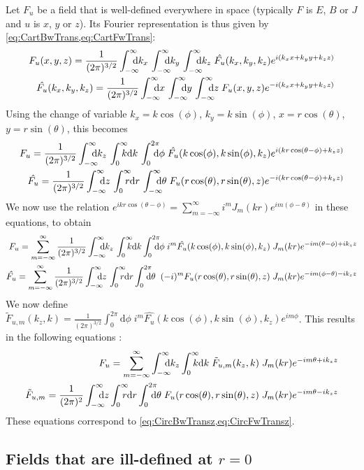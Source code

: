 Let $F_u$ be a field that is well-defined everywhere in space
(typically $F$ is $E$, $B$ or $J$ and $u$ is $x$, $y$ or $z$). Its Fourier representation
is thus given by \cref{eq:CartBwTrans,eq:CartFwTrans}:
\begin{align*}
F_u(x,y,z) = \frac{1}{(2\pi)^{3/2}}\Integ{k_x} \,\Integ{k_y}\,
\Integ{k_z} \; \hat{F_u}(k_x,k_y,k_z) e^{i(k_x x + k_y y + k_z z)} \\
\hat{F_u}(k_x,k_y,k_z)  = \frac{1}{(2\pi)^{3/2}}\Integ{x} \,\Integ{y}\,
\Integ{z} \; F_u(x,y,z) e^{-i(k_x x + k_y y + k_z z)} 
\end{align*}
Using the change of variable $k_x=k\cos(\phi)$, $k_y = k\sin(\phi)$,
$x=r\cos(\theta)$, $y=r\sin(\theta)$, this becomes
 \begin{align*}
F_u = \frac{1}{(2\pi)^{3/2}}\Integ{k_z} \,\RInteg{k}\,
\TInteg{\phi} \; \hat{F_u}(k\cos(\phi),k\sin(\phi),k_z)
e^{i(k r \cos(\theta-\phi) + k_z z)} \\
\hat{F_u}  = \frac{1}{(2\pi)^{3/2}}\Integ{z} \,\RInteg{r}\,
\Integ{\theta} \; F_u(r\cos(\theta),r\sin(\theta),z) e^{-i(k r \cos(\theta-\phi) + k_z z)} 
\end{align*}
We now use the relation $e^{ikr\cos(\theta-\phi)} =
\sum_{m=-\infty}^{\infty} i^m J_m(kr) e^{im(\phi-\theta)}$ in these equations, to obtain
\begin{align*}
F_u = \sum_{m=-\infty}^{\infty} \frac{1}{(2\pi)^{3/2}}\Integ{k_z} \,\RInteg{k}
\TInteg{\phi} \; i^m \hat{F_u}(k\cos(\phi),k\sin(\phi),k_z) \;
J_m(kr) e^{-im(\theta-\phi) + ik_z z} \\
\hat{F_u}  =  \sum_{m=-\infty}^{\infty} \frac{1}{(2\pi)^{3/2}}\Integ{z} \,\RInteg{r}
\TInteg{\theta} \;\; (-i)^m F_u(r\cos(\theta),r\sin(\theta),z) \; J_m(kr) e^{-im(\phi-\theta) -ik_z z} 
\end{align*}
We now define $\tilde{F}_{u,m}(k_z,k) = \frac{1}{(2\pi)^{3/2}}\int_0^{2\pi}
\mathrm{d}\phi \; i^m \hat{F_u}(k\cos(\phi),k\sin(\phi),k_z)
e^{im\phi}$. This results in the following equations :
\begin{align*}
F_u = \sum_{m=-\infty}^{\infty} \Integ{k_z}
\RInteg{k}\; \tilde{F}_{u,m}(k_z,k) \; J_m(kr) e^{-im\theta + ik_z z} 
\\
\tilde{F}_{u,m} = \frac{1}{(2\pi)^2} \Integ{z} \RInteg{r}
\TInteg{\theta} \;F_u(r\cos(\theta), r\sin(\theta),z)\; J_m(kr) e^{-im\theta
 - i k_z z}
\end{align*}
These equations correspond to \cref{eq:CircBwTransz,eq:CircFwTransz}.

\subsection{Fields that are ill-defined at $r=0$}

